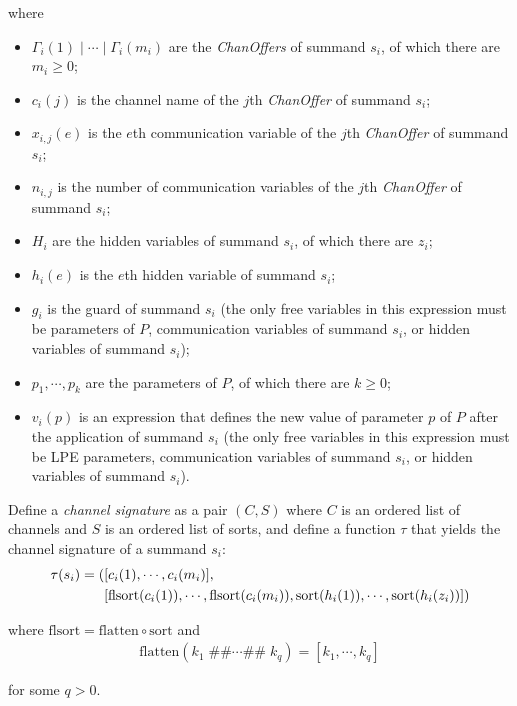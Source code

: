 where

\begin{itemize}
\item $\Gamma_i(1) \; \texttt{|} \; \cdots{} \; \texttt{|} \; \Gamma_i(m_i)$ are the \textit{ChanOffers} of summand $s_i$, of which there are $m_i \geq 0$;
\item $c_i(j)$ is the channel name of the $j$th \textit{ChanOffer} of summand $s_i$;
\item $x_{i,j}(e)$ is the $e$th communication variable of the $j$th \textit{ChanOffer} of summand $s_i$;
\item $n_{i,j}$ is the number of communication variables of the $j$th \textit{ChanOffer} of summand $s_i$;
\item $H_i$ are the hidden variables of summand $s_i$, of which there are $z_i$;
\item $h_i(e)$ is the $e$th hidden variable of summand $s_i$;
\item $g_i$ is the guard of summand $s_i$ (the only free variables in this expression must be parameters of $P$, communication variables of summand $s_i$, or hidden variables of summand $s_i$);
\item $p_1, \cdots{}, p_k$ are the parameters of $P$, of which there are $k \geq 0$;
\item $v_i(p)$ is an expression that defines the new value of parameter $p$ of $P$ after the application of summand $s_i$ (the only free variables in this expression must be LPE parameters, communication variables of summand $s_i$, or hidden variables of summand $s_i$).
\end{itemize}

Define a \emph{channel signature} as a pair $(C, S)$ where $C$ is an ordered list of channels and $S$ is an ordered list of sorts, and define a function $\tau$ that yields the channel signature of a summand $s_i$:
\begin{align*}
\tau(s_i) = (&[ c_i(1), \cdots{}, c_i(m_i)], \\
&[\text{flsort}(c_i(1)), \cdots{}, \text{flsort}(c_i(m_i)), \text{sort}(h_i(1)), \cdots{}, \text{sort}(h_i(z_i))])
\end{align*}

where $\text{flsort} = \text{flatten} \circ{} \text{sort}$ and
\begin{align*}
\text{flatten}(k_1 \; \texttt{\#\#} \cdots{} \texttt{\#\#} \; k_q) = [k_1, \cdots{}, k_q]
\end{align*}

for some $q > 0$.

